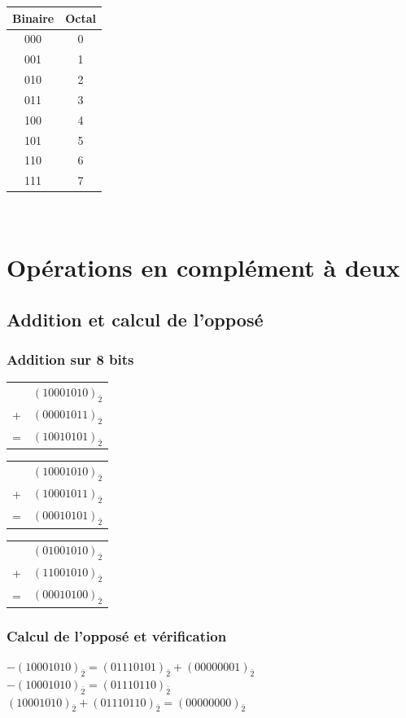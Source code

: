 \documentclass[10pt,a4paper]{article}
\begin{document}
\begin{tabular}{c|c}
Binaire & Octal \\ 
\hline 
000 & 0 \\ 
001 & 1 \\ 
010 & 2 \\ 
011 & 3 \\ 
100 & 4 \\ 
101 & 5 \\ 
110 & 6 \\ 
111 & 7 \\ 
\end{tabular} \\

\section{Opérations en complément à deux}
\subsection{Addition et calcul de l'opposé}
\subsubsection{Addition sur 8 bits}
\begin{tabular}{cc}
  & $(10001010)_{\bar{2}}$\\ 
+ & $(00001011)_{\bar{2}}$ \\ 
\hline 
= & $(10010101)_{\bar{2}}$
\end{tabular} 
\bigskip 
\begin{tabular}{cc}
  & $(10001010)_{\bar{2}}$\\ 
+ & $(10001011)_{\bar{2}}$ \\ 
\hline 
= & $(00010101)_{\bar{2}}$
\end{tabular} 
\bigskip
\begin{tabular}{cc}
  & $(01001010)_{\bar{2}}$\\ 
+ & $(11001010)_{\bar{2}}$ \\ 
\hline 
= & $(00010100)_{\bar{2}}$
\end{tabular}

\subsubsection{Calcul de l'opposé et vérification}
\begin{flushleft}
$-(10001010)_{\bar{2}} = (01110101)_{\bar{2}} + (00000001)_{\bar{2}}$\\
$-(10001010)_{\bar{2}} = (01110110)_{\bar{2}}$\\
$(10001010)_{\bar{2}} +(01110110)_{\bar{2}} = (00000000)_{\bar{2}}$\\
\end{flushleft}
\end{document}
